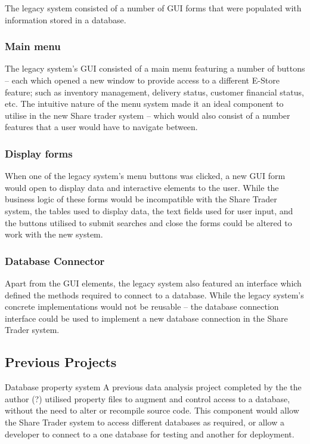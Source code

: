 \documentclass[12pt, a4paper,titlepage]{article}
\begin{document}
The legacy system consisted of a number of GUI forms that were populated with
information stored in a database.

\subsubsection{Main menu}
The legacy system’s GUI consisted of a main menu featuring a number of buttons
– each which opened a new window to provide access to a different E-Store
feature; such as inventory management, delivery status, customer financial
status, etc.  The intuitive nature of the menu system made it an ideal
component to utilise in the new Share trader system – which would also consist
of a number features that a user would have to navigate between.

\subsubsection{Display forms}
When one of the legacy system’s menu buttons was clicked, a new GUI form would
open to display data and interactive elements to the user.  While the business
logic of these forms would be incompatible with the Share Trader system, the
tables used to display data, the text fields used for user input, and the
buttons utilised to submit searches and close the forms could be altered to
work with the new system.

\subsubsection{Database Connector}
Apart from the GUI elements, the legacy system also featured an interface
which defined the methods required to connect to a database. While the legacy
system’s concrete implementations would not be reusable – the database
connection interface could be used to implement a new database connection in
the Share Trader system.

\subsection{Previous Projects}
Database property system
A previous data analysis project completed by the the author (?) utilised
property files to augment and control access to a database, without the need
to alter or recompile source code. This component would allow the Share Trader
system to access different databases as required, or allow a developer to
connect to a one database for testing and another for deployment.
\end{document}

